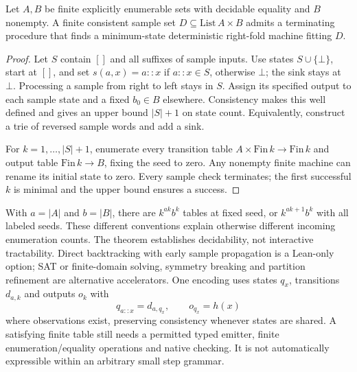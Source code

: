 \begin{theorem}
\label{thm:carrier-finite-machine}
Let $A,B$ be finite explicitly enumerable sets with decidable equality and
$B$ nonempty. A finite consistent sample set
$D\subseteq\mathrm{List}\,A\times B$ admits a terminating procedure that
finds a minimum-state deterministic right-fold machine fitting $D$.
\end{theorem}
\begin{proof}
Let $S$ contain $[]$ and all suffixes of sample inputs. Use states
$S\cup\{\bot\}$, start at $[]$, and set $s(a,x)=a::x$ if $a::x\in S$,
otherwise $\bot$; the sink stays at $\bot$. Processing a sample from right
to left stays in $S$. Assign its specified output to each sample state and a
fixed $b_0\in B$ elsewhere. Consistency makes this well defined and gives
an upper bound $|S|+1$ on state count. Equivalently, construct a trie of
reversed sample words and add a sink.

For $k=1,\ldots,|S|+1$, enumerate every transition table
$A\times\mathrm{Fin}\,k\to\mathrm{Fin}\,k$ and output table
$\mathrm{Fin}\,k\to B$, fixing the seed to zero. Any nonempty finite
machine can rename its initial state to zero. Every sample check terminates;
the first successful $k$ is minimal and the upper bound ensures a success.
\end{proof}

With $a=|A|$ and $b=|B|$, there are $k^{ak}b^k$ tables at fixed seed, or
$k^{ak+1}b^k$ with all labeled seeds. These different conventions explain
otherwise different incoming enumeration counts. The theorem establishes
decidability, not interactive tractability. Direct backtracking with early
sample propagation is a Lean-only option; SAT or finite-domain solving,
symmetry breaking and partition refinement are alternative accelerators.
One encoding uses states $q_x$, transitions $d_{a,k}$ and outputs $o_k$ with
\[
 q_{a::x}=d_{a,q_x},\qquad o_{q_x}=h(x)
\]
where observations exist, preserving consistency whenever states are shared.
A satisfying finite table still needs a permitted typed emitter, finite
enumeration/equality operations and native checking. It is not automatically
expressible within an arbitrary small step grammar.

